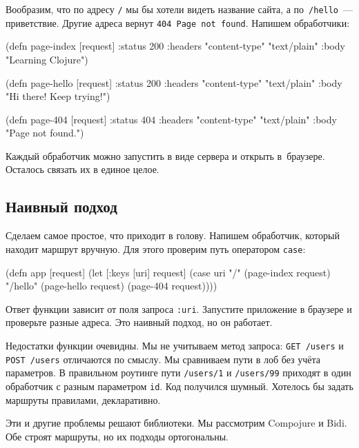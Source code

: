 Вообразим, что по адресу \verb|/| мы бы хотели видеть название сайта, а
по~\verb|/hello|~--- приветствие. Другие адреса вернут
\verb|404 Page not found|. Напишем обработчики:

\begin{english}
  \begin{clojure}
(defn page-index [request]
  {:status 200
   :headers {"content-type" "text/plain"}
   :body "Learning Clojure"})

(defn page-hello [request]
  {:status 200
   :headers {"content-type" "text/plain"}
   :body "Hi there! Keep trying!"})

(defn page-404 [request]
  {:status 404
   :headers {"content-type" "text/plain"}
   :body "Page not found."})
  \end{clojure}
\end{english}

Каждый обработчик можно запустить в виде сервера и открыть в~браузере. Осталось
связать их в единое целое.

\subsection{Наивный подход}

Сделаем самое простое, что приходит в голову. Напишем обработчик, который
находит маршрут вручную. Для этого проверим путь оператором \verb|case|:

\begin{english}
  \begin{clojure}
(defn app [request]
  (let [{:keys [uri]} request]
    (case uri
      "/"      (page-index request)
      "/hello" (page-hello request)
      (page-404 request))))
  \end{clojure}
\end{english}

Ответ функции зависит от поля запроса \verb|:uri|. Запустите приложение в
браузере и проверьте разные адреса. Это наивный подход, но он работает.

Недостатки функции очевидны. Мы не учитываем метод запроса: \verb|GET /users|
и \verb|POST /users| отличаются по смыслу. Мы сравниваем пути в лоб без учёта
параметров. В правильном роутинге пути \verb|/users/1| и \verb|/users/99|
приходят в один обработчик с разным параметром \verb|id|. Код получился
шумный. Хотелось бы задать маршруты правилами, декларативно.

Эти и другие проблемы решают библиотеки. Мы рассмотрим Compojure и Bidi. Обе
строят маршруты, но их подходы ортогональны.

